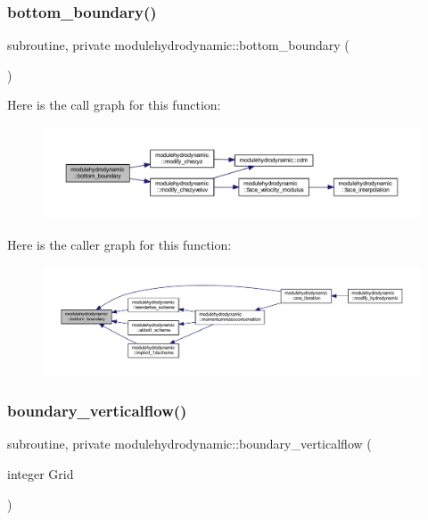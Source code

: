 \subsubsection{\texorpdfstring{bottom\+\_\+boundary()}{bottom\_boundary()}}
{\footnotesize\ttfamily subroutine, private modulehydrodynamic\+::bottom\+\_\+boundary (\begin{DoxyParamCaption}{ }\end{DoxyParamCaption})\hspace{0.3cm}{\ttfamily [private]}}

Here is the call graph for this function\+:\nopagebreak
\begin{figure}[H]
\begin{center}
\leavevmode
\includegraphics[width=350pt]{namespacemodulehydrodynamic_a560d4076559adb32fe2884f63e0b13da_cgraph}
\end{center}
\end{figure}
Here is the caller graph for this function\+:\nopagebreak
\begin{figure}[H]
\begin{center}
\leavevmode
\includegraphics[width=350pt]{namespacemodulehydrodynamic_a560d4076559adb32fe2884f63e0b13da_icgraph}
\end{center}
\end{figure}
\mbox{\label{namespacemodulehydrodynamic_a08186b721c96e023d8a58a34dc22522f}} 
\subsubsection{\texorpdfstring{boundary\+\_\+verticalflow()}{boundary\_verticalflow()}}
{\footnotesize\ttfamily subroutine, private modulehydrodynamic\+::boundary\+\_\+verticalflow (\begin{DoxyParamCaption}\item[{integer}]{Grid }\end{DoxyParamCaption})\hspace{0.3cm}{\ttfamily [private]}}

